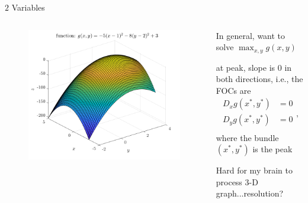 \documentclass[11pt,aspectratio=169,usenames,dvipsnames]{beamer}
\let\tempone\itemize
\let\temptwo\enditemize
\renewenvironment{itemize}{\tempone\addtolength{\itemsep}{\fill}}{\temptwo}
\begin{document}
\begin{frame}{$2$ Variables}
\label{slide:_2__Variables}
    \begin{columns}
        \begin{column}{0.6\textwidth}
            \begin{figure}
                \includegraphics[width=\textwidth]{./figures/2Var.png}
            \end{figure}
        \end{column}
        \begin{column}{0.4\textwidth}
            In general, want to solve $\max_{x, y} g( x, y )$
            \begin{itemize}
                \item at peak, slope is $ 0 $ \alert{in both directions}, i.e., the FOC\alert{s} are
                \begin{equation*}
                    \begin{split}
                        D_{x}g( x^{*}, y^{*} )
                            & = 0
                        \\
                        D_{y}g( x^{*}, y^{*} )
                            & = 0
                        \\
                    \end{split}
                ,\end{equation*}
                where the bundle $ (x^{*}, y^{*}) $ is the peak
                \item Hard for my brain to process 3-D graph...\alert{resolution}?
            \end{itemize}
        \end{column}
    \end{columns}

\end{frame}
\end{document}
